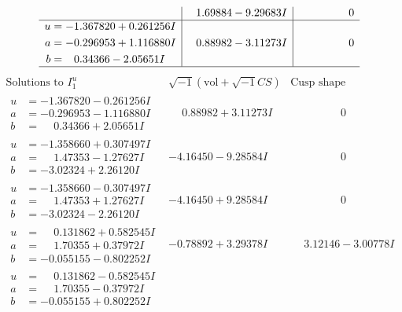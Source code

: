 \documentclass[1p]{elsarticle_modified}
\theoremstyle{definition}
\newcommand{\I}{\sqrt{-1}}
\begin{document}
$$\begin{array}{c|c|c}
 & \phantom{-}1.69884 - 9.29683 I & \phantom{-0.000000 } 0 \\ \hline\begin{aligned}
u &= -1.367820 + 0.261256 I \\
a &= -0.296953 + 1.116880 I \\
b &= \phantom{-}0.34366 - 2.05651 I\end{aligned}
 & \phantom{-}0.88982 - 3.11273 I & \phantom{-0.000000 } 0\\
 \hline 
 \end{array}$$\newpage$$\begin{array}{c|c|c}  
\text{Solutions to }I^u_{1}& \I (\text{vol} + \sqrt{-1}CS) & \text{Cusp shape}\\
 \hline 
\begin{aligned}
u &= -1.367820 - 0.261256 I \\
a &= -0.296953 - 1.116880 I \\
b &= \phantom{-}0.34366 + 2.05651 I\end{aligned}
 & \phantom{-}0.88982 + 3.11273 I & \phantom{-0.000000 } 0 \\ \hline\begin{aligned}
u &= -1.358660 + 0.307497 I \\
a &= \phantom{-}1.47353 - 1.27627 I \\
b &= -3.02324 + 2.26120 I\end{aligned}
 & -4.16450 - 9.28584 I & \phantom{-0.000000 } 0 \\ \hline\begin{aligned}
u &= -1.358660 - 0.307497 I \\
a &= \phantom{-}1.47353 + 1.27627 I \\
b &= -3.02324 - 2.26120 I\end{aligned}
 & -4.16450 + 9.28584 I & \phantom{-0.000000 } 0 \\ \hline\begin{aligned}
u &= \phantom{-}0.131862 + 0.582545 I \\
a &= \phantom{-}1.70355 + 0.37972 I \\
b &= -0.055155 - 0.802252 I\end{aligned}
 & -0.78892 + 3.29378 I & \phantom{-}3.12146 - 3.00778 I \\ \hline\begin{aligned}
u &= \phantom{-}0.131862 - 0.582545 I \\
a &= \phantom{-}1.70355 - 0.37972 I \\
b &= -0.055155 + 0.802252 I\end{aligned}

\end{array}$$
\end{document}
